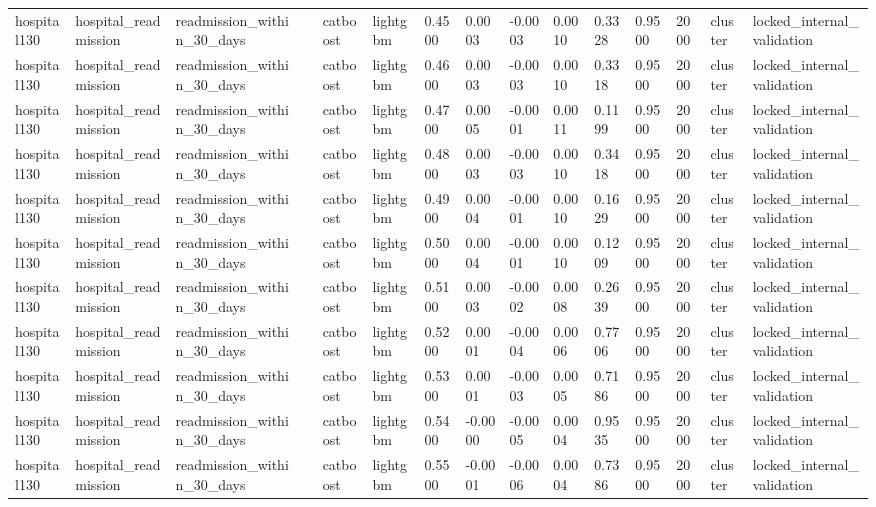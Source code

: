 \begin{tabular}{lllllllllllllll}
hospital130 & hospital\_readmission & readmission\_within\_30\_days &  & catboost & lightgbm & 0.4500 & 0.0003 & -0.0003 & 0.0010 & 0.3328 & 0.9500 & 2000 & cluster & locked\_internal\_validation \\
hospital130 & hospital\_readmission & readmission\_within\_30\_days &  & catboost & lightgbm & 0.4600 & 0.0003 & -0.0003 & 0.0010 & 0.3318 & 0.9500 & 2000 & cluster & locked\_internal\_validation \\
hospital130 & hospital\_readmission & readmission\_within\_30\_days &  & catboost & lightgbm & 0.4700 & 0.0005 & -0.0001 & 0.0011 & 0.1199 & 0.9500 & 2000 & cluster & locked\_internal\_validation \\
hospital130 & hospital\_readmission & readmission\_within\_30\_days &  & catboost & lightgbm & 0.4800 & 0.0003 & -0.0003 & 0.0010 & 0.3418 & 0.9500 & 2000 & cluster & locked\_internal\_validation \\
hospital130 & hospital\_readmission & readmission\_within\_30\_days &  & catboost & lightgbm & 0.4900 & 0.0004 & -0.0001 & 0.0010 & 0.1629 & 0.9500 & 2000 & cluster & locked\_internal\_validation \\
hospital130 & hospital\_readmission & readmission\_within\_30\_days &  & catboost & lightgbm & 0.5000 & 0.0004 & -0.0001 & 0.0010 & 0.1209 & 0.9500 & 2000 & cluster & locked\_internal\_validation \\
hospital130 & hospital\_readmission & readmission\_within\_30\_days &  & catboost & lightgbm & 0.5100 & 0.0003 & -0.0002 & 0.0008 & 0.2639 & 0.9500 & 2000 & cluster & locked\_internal\_validation \\
hospital130 & hospital\_readmission & readmission\_within\_30\_days &  & catboost & lightgbm & 0.5200 & 0.0001 & -0.0004 & 0.0006 & 0.7706 & 0.9500 & 2000 & cluster & locked\_internal\_validation \\
hospital130 & hospital\_readmission & readmission\_within\_30\_days &  & catboost & lightgbm & 0.5300 & 0.0001 & -0.0003 & 0.0005 & 0.7186 & 0.9500 & 2000 & cluster & locked\_internal\_validation \\
hospital130 & hospital\_readmission & readmission\_within\_30\_days &  & catboost & lightgbm & 0.5400 & -0.0000 & -0.0005 & 0.0004 & 0.9535 & 0.9500 & 2000 & cluster & locked\_internal\_validation \\
hospital130 & hospital\_readmission & readmission\_within\_30\_days &  & catboost & lightgbm & 0.5500 & -0.0001 & -0.0006 & 0.0004 & 0.7386 & 0.9500 & 2000 & cluster & locked\_internal\_validation \\

\end{tabular}
